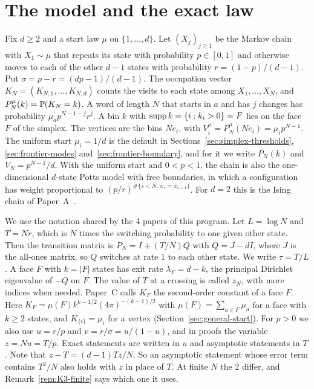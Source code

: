\section{The model and the exact law}\label{sec:multistate-model}

Fix $d\ge2$ and a start law $\mu$ on $\{1,\ldots,d\}$. Let $(X_j)_{j\ge1}$ be the
Markov chain with $X_1\sim\mu$ that repeats its state with probability
$p\in[0,1]$ and otherwise moves to each of the other $d-1$ states with
probability $r=(1-p)/(d-1)$. Put $\sigma=p-r=(dp-1)/(d-1)$. The
occupation vector $K_N=(K_{N,1},\ldots,K_{N,d})$ counts the visits to each state
among $X_1,\ldots,X_N$, and $P^\mu_N(k)=\mathbb P(K_N=k)$. A word of length $N$ that
starts in $a$ and has $j$ changes has probability $\mu_ap^{N-1-j}r^j$. A bin $k$
with $\operatorname{supp} k=\{i:k_i>0\}=F$ lies on the face $F$ of the simplex. The vertices are
the bins $Ne_i$, with $V^\mu_i=P^\mu_N(Ne_i)=\mu_ip^{N-1}$. The uniform start
$\mu_i=1/d$ is the default in Sections~\ref{sec:simplex-thresholds},
\ref{sec:frontier-modes} and~\ref{sec:frontier-boundary}, and for it we write
$P_N(k)$ and $V_N=p^{N-1}/d$. With the uniform start and $0<p<1$, the chain is
also the one-dimensional $d$-state Potts model with free boundaries, in which a
configuration has weight proportional to $(p/r)^{\#\{s<N:\,x_s=x_{s+1}\}}$. For
$d=2$ this is the Ising chain of Paper~A~\cite{paperA}.

We use the notation shared by the 4 papers of this program. Let $L=\log N$ and
$T=Nr$, which is $N$ times the switching probability to one given other state.
Then the transition matrix is $P_N=I+(T/N)Q$ with $Q=J-dI$, where $J$ is the
all-ones matrix, so $Q$ switches at rate $1$ to each other state. We write
$\tau=T/L$. A face $F$ with $k=|F|$ states has exit rate $\lambda_F=d-k$, the
principal Dirichlet eigenvalue of $-Q$ on $F$. The value of $T$ at a crossing is
called $z_N$, with more indices when needed. Paper~C calls $K_F$ the
second-order constant of a face $F$. Here $K_F=\mu(F)k^{k-1/2}(4\pi)^{-(k-1)/2}$
with $\mu(F)=\sum_{a\in F}\mu_a$ for a face with $k\ge2$ states, and
$K_{\{i\}}=\mu_i$ for a vertex (Section~\ref{sec:general-start}). For $p>0$ we
also use $u=r/p$ and $v=r/\sigma=u/(1-u)$, and in proofs the variable $z=Nu=T/p$. Exact statements
are written in $u$ and asymptotic statements in $T$. Note that
$z-T=(d-1)Tz/N$. So an asymptotic statement whose error term contains $T^2/N$
also holds with $z$ in place of $T$. At finite $N$ the 2 differ, and
Remark~\ref{rem:K3-finite} says which one it uses.

